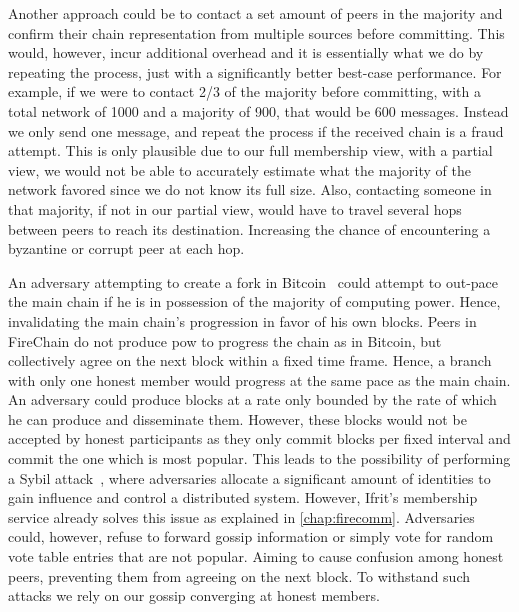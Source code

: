 \documentclass[USenglish]{uit-thesis}
\begin{document}
Another approach could be to contact a set amount of peers in the majority and confirm their chain representation from multiple sources before committing.
This would, however, incur additional overhead and it is essentially what we do by repeating the process, just with a significantly better best-case performance.
For example, if we were to contact 2/3 of the majority before committing, with a total network of 1000 and a majority of 900, that would be 600 messages.
Instead we only send one message, and repeat the process if the received chain is a fraud attempt.
This is only plausible due to our full membership view, with a partial view, we would not be able to accurately estimate what the majority of the network favored since we do not know its full size.
Also, contacting someone in that majority, if not in our partial view, would have to travel several hops between peers to reach its destination.
Increasing the chance of encountering a byzantine or corrupt peer at each hop.

An adversary attempting to create a fork in Bitcoin~\cite{bitcoin} could attempt to out-pace the main chain if he is in possession of the majority of computing power.
Hence, invalidating the main chain's progression in favor of his own blocks.
Peers in FireChain do not produce \gls{pow} to progress the chain as in Bitcoin, but collectively agree on the next block within a fixed time frame.
Hence, a branch with only one honest member would progress at the same pace as the main chain.
An adversary could produce blocks at a rate only bounded by the rate of which he can produce and disseminate them.
However, these blocks would not be accepted by honest participants as they only commit blocks per fixed interval and commit the one which is most popular.
This leads to the possibility of performing a Sybil attack~\cite{sybil}, where adversaries allocate a significant amount of identities to gain influence and control a distributed system.
However, Ifrit's membership service already solves this issue as explained in \autoref{chap:firecomm}.
Adversaries could, however, refuse to forward gossip information or simply vote for random vote table entries that are not popular.
Aiming to cause confusion among honest peers, preventing them from agreeing on the next block.
To withstand such attacks we rely on our gossip converging at honest members.
\end{document}
